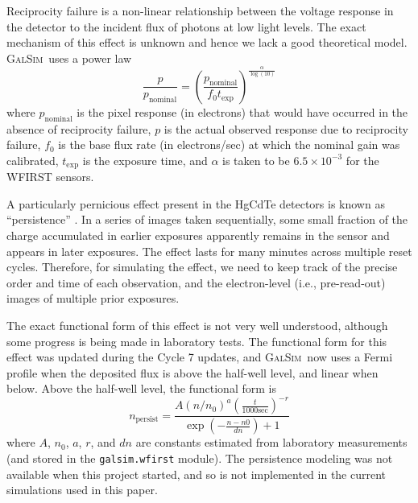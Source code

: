 \documentclass[usenatbib]{mnras}
\newcommand{\galsim}{\textsc{GalSim}}
\begin{document}
Reciprocity failure \citep{Biesiadzinski2011} is a non-linear relationship between the voltage response in the detector to the incident flux of photons at low light levels.
The exact mechanism of this effect is unknown and hence we lack a good theoretical model. 
\galsim\ uses a power law
\begin{equation}
\frac{p}{p_\mathrm{nominal}} =
 \left(\frac{p_\mathrm{nominal}}{f_0 t_\mathrm{exp}}\right)^{\frac{\alpha}{\log(10)}}
\end{equation}
where $p_\mathrm{nominal}$ is the pixel response (in electrons) that would have occurred in the absence of reciprocity failure,
$p$ is the actual observed response due to reciprocity failure,
$f_0$ is the base flux rate (in electrons/sec) at which the nominal gain was calibrated, 
$t_\mathrm{exp}$ is the exposure time,
and $\alpha$ is taken to be $6.5 \times 10^{-3}$ for the WFIRST sensors.

A particularly pernicious effect present in the HgCdTe detectors is known as ``persistence'' \citep{10.1117/12.789619,2014arXiv1402.4181A,2016SPIE.9915E..0GM}.  
In a series of images taken sequentially, some small fraction of the charge accumulated in earlier exposures apparently remains in the sensor and appears in later exposures.  
The effect lasts for many minutes across multiple reset cycles.  
Therefore, for simulating the effect, we need to keep track of the precise order and time of each observation, and the electron-level (i.e., pre-read-out) images of multiple prior exposures.

The exact functional form of this effect is not very well understood, although some progress is being made in laboratory tests.  
The functional form for this effect was updated during the Cycle 7 updates, and
\galsim\ now uses a Fermi profile when the deposited flux is above the half-well level, and linear when below.
Above the half-well level, the functional form is
\begin{equation}
n_\mathrm{persist} = \frac{A \left(n/n_0\right)^a  \left(\frac{t}{1000 \mathrm{sec}}\right)^{-r}}
{ \exp(- \frac{n-n0}{dn})+ 1}
\end{equation}
where $A$, $n_0$, $a$, $r$, and $dn$ are constants estimated from laboratory measurements (and stored in the \texttt{galsim.wfirst} module).
The persistence modeling was not available when this project started, and so is not implemented in the current simulations used in this paper.
\end{document}
